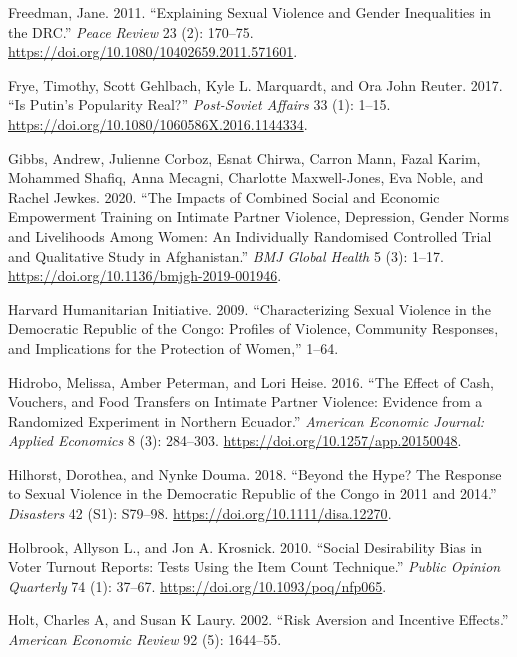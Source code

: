 \documentclass[
]{article}
\newlength{\cslhangindent}
\newenvironment{CSLReferences}[2] %
 {\begin{list}{}{%
  \setlength{\itemindent}{0pt}
  \setlength{\leftmargin}{0pt}
  \setlength{\parsep}{0pt}
  \ifodd #1
   \setlength{\leftmargin}{\cslhangindent}
   \setlength{\itemindent}{-1\cslhangindent}
  \fi
  \setlength{\itemsep}{#2\baselineskip}}}
 {\end{list}}
\begin{document}
\begin{CSLReferences}{1}{0}
Freedman, Jane. 2011. {``Explaining Sexual Violence and Gender
Inequalities in the {DRC}.''} \emph{Peace Review} 23 (2): 170--75.
\url{https://doi.org/10.1080/10402659.2011.571601}.

Frye, Timothy, Scott Gehlbach, Kyle L. Marquardt, and Ora John Reuter.
2017. {``Is {Putin}'s Popularity Real?''} \emph{Post-Soviet Affairs} 33
(1): 1--15. \url{https://doi.org/10.1080/1060586X.2016.1144334}.

Gibbs, Andrew, Julienne Corboz, Esnat Chirwa, Carron Mann, Fazal Karim,
Mohammed Shafiq, Anna Mecagni, Charlotte Maxwell-Jones, Eva Noble, and
Rachel Jewkes. 2020. {``The Impacts of Combined Social and Economic
Empowerment Training on Intimate Partner Violence, Depression, Gender
Norms and Livelihoods Among Women: {An} Individually Randomised
Controlled Trial and Qualitative Study in {Afghanistan}.''} \emph{BMJ
Global Health} 5 (3): 1--17.
\url{https://doi.org/10.1136/bmjgh-2019-001946}.

Harvard Humanitarian Initiative. 2009. {``Characterizing {Sexual
Violence} in the {Democratic Republic} of the {Congo}: {Profiles} of
{Violence}, {Community Responses}, and {Implications} for the
{Protection} of {Women},''} 1--64.

Hidrobo, Melissa, Amber Peterman, and Lori Heise. 2016. {``The Effect of
Cash, Vouchers, and Food Transfers on Intimate Partner Violence:
{Evidence} from a Randomized Experiment in {Northern Ecuador}.''}
\emph{American Economic Journal: Applied Economics} 8 (3): 284--303.
\url{https://doi.org/10.1257/app.20150048}.

Hilhorst, Dorothea, and Nynke Douma. 2018. {``Beyond the Hype? {The}
Response to Sexual Violence in the {Democratic Republic} of the {Congo}
in 2011 and 2014.''} \emph{Disasters} 42 (S1): S79--98.
\url{https://doi.org/10.1111/disa.12270}.

Holbrook, Allyson L., and Jon A. Krosnick. 2010. {``Social Desirability
Bias in Voter Turnout Reports: {Tests} Using the Item Count
Technique.''} \emph{Public Opinion Quarterly} 74 (1): 37--67.
\url{https://doi.org/10.1093/poq/nfp065}.

Holt, Charles A, and Susan K Laury. 2002. {``Risk {Aversion} and
{Incentive Effects}.''} \emph{American Economic Review} 92 (5):
1644--55.


\end{CSLReferences}
\end{document}
